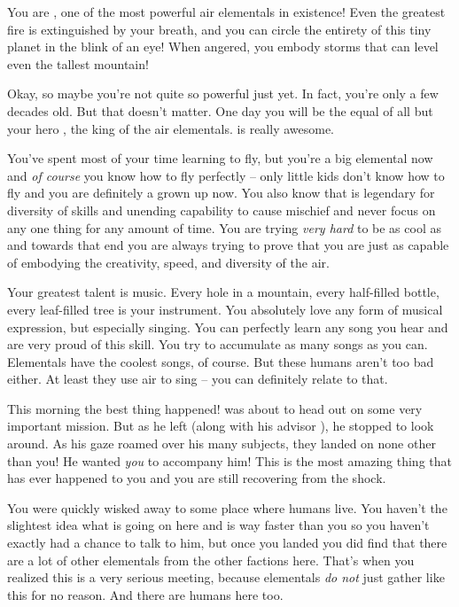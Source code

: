 \documentclass[char]{elementals}
\begin{document}
\name{\cMiniAir{}}

You are \cMiniAir{\intro}, one of the most powerful air elementals in existence! Even the greatest fire is extinguished by your breath, and you can circle the entirety of this tiny planet in the blink of an eye! When angered, you embody storms that can level even the tallest mountain!

Okay, so maybe you're not quite so powerful just yet. In fact, you're only a few decades old. But that doesn't matter. One day you will be the equal of all but your hero \cKing{\intro}, the king of the air elementals. \cKing{\They} is really awesome.

You've spent most of your time learning to fly, but you're a big elemental now and \emph{of course} you know how to fly perfectly -- only little kids don't know how to fly and you are definitely a grown up now. You also know that \cKing{} is legendary for \cKing{\their} diversity of skills and unending capability to cause mischief and never focus on any one thing for any amount of time. You are trying \emph{very hard} to be as cool as \cKing{} and towards that end you are always trying to prove that you are just as capable of embodying the creativity, speed, and diversity of the air.

Your greatest talent is music. Every hole in a mountain, every half-filled bottle, every leaf-filled tree is your instrument. You absolutely love any form of musical expression, but especially singing. You can perfectly learn any song you hear and are very proud of this skill. You try to accumulate as many songs as you can. Elementals have the coolest songs, of course. But these humans aren't too bad either. At least they use air to sing -- you can definitely relate to that.

This morning the best thing happened! \cKing{} was about to head out on some very important mission. But as he left (along with his advisor \cNaturalist{}), he stopped to look around. As his gaze roamed over his many subjects, they landed on none other than you! He wanted \emph{you} to accompany him! This is the most amazing thing that has ever happened to you and you are still recovering from the shock.

You were quickly wisked away to some place where humans live. You haven't the slightest idea what is going on here and \cKing{} is way faster than you so you haven't exactly had a chance to talk to him, but once you landed you did find that there are a lot of other elementals from the other factions here. That's when you realized this is a very serious meeting, because elementals \emph{do not} just gather like this for no reason. And there are humans here too.
\end{document}
